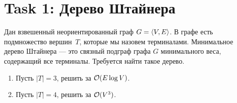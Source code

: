 \section{Task 1: Дерево Штайнера}
\begin{task}
    Дан взвешенный неориентированный граф $G = \braket{V, E}$.
    В графе есть подмножество вершин~$T$,
    которые мы назовем терминалами.
    Минимальное дерево Штайнера --- это связный подграф графа $G$ минимального веса, содержащий все терминалы.
    Требуется найти такое дерево.
	\begin{enumerate}
        \item Пусть $|T| = 3$, решить за $\mathcal{O}(E \log V)$.
        \item Пусть $|T| = 4$, решить за $\mathcal{O}(V^3)$.
	\end{enumerate}
\end{task}

